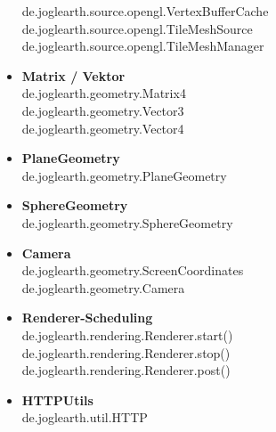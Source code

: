 \documentclass[10pt]{scrreprt}
\begin{document}
\begin{itemize}
de.joglearth.source.opengl.VertexBufferCache\\
de.joglearth.source.opengl.TileMeshSource\\
de.joglearth.source.opengl.TileMeshManager
\item \textbf{Matrix / Vektor}\\
de.joglearth.geometry.Matrix4\\
de.joglearth.geometry.Vector3\\
de.joglearth.geometry.Vector4\\
\item \textbf{PlaneGeometry}\\
de.joglearth.geometry.PlaneGeometry
\item \textbf{SphereGeometry}\\
de.joglearth.geometry.SphereGeometry
\item \textbf{Camera}\\
de.joglearth.geometry.ScreenCoordinates\\
de.joglearth.geometry.Camera
\item \textbf{Renderer-Scheduling}\\
de.joglearth.rendering.Renderer.start()\\
de.joglearth.rendering.Renderer.stop()\\
de.joglearth.rendering.Renderer.post()
\item \textbf{HTTPUtils}\\
de.joglearth.util.HTTP
\end{itemize}
\end{document}
